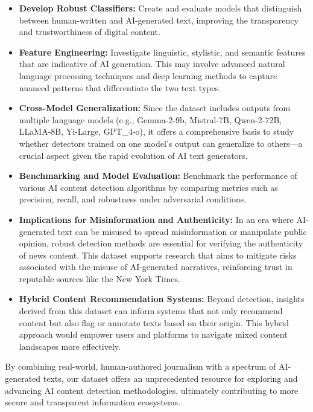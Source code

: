\begin{itemize}
    \item \textbf{Develop Robust Classifiers:} Create and evaluate models that distinguish between human-written and AI-generated text, improving the transparency and trustworthiness of digital content.
    \item \textbf{Feature Engineering:} Investigate linguistic, stylistic, and semantic features that are indicative of AI generation. This may involve advanced natural language processing techniques and deep learning methods to capture nuanced patterns that differentiate the two text types.
    \item \textbf{Cross-Model Generalization:} Since the dataset includes outputs from multiple language models (e.g., Gemma-2-9b, Mistral-7B, Qwen-2-72B, LLaMA-8B, Yi-Large, GPT\_4-o), it offers a comprehensive basis to study whether detectors trained on one model’s output can generalize to others—a crucial aspect given the rapid evolution of AI text generators.
    \item \textbf{Benchmarking and Model Evaluation:} Benchmark the performance of various AI content detection algorithms by comparing metrics such as precision, recall, and robustness under adversarial conditions.
    \item \textbf{Implications for Misinformation and Authenticity:} In an era where AI-generated text can be misused to spread misinformation or manipulate public opinion, robust detection methods are essential for verifying the authenticity of news content. This dataset supports research that aims to mitigate risks associated with the misuse of AI-generated narratives, reinforcing trust in reputable sources like the New York Times.
    \item \textbf{Hybrid Content Recommendation Systems:} Beyond detection, insights derived from this dataset can inform systems that not only recommend content but also flag or annotate texts based on their origin. This hybrid approach would empower users and platforms to navigate mixed content landscapes more effectively.
\end{itemize}
By combining real-world, human-authored journalism with a spectrum of AI-generated texts, our dataset offers an unprecedented resource for exploring and advancing AI content detection methodologies, ultimately contributing to more secure and transparent information ecosystems.

